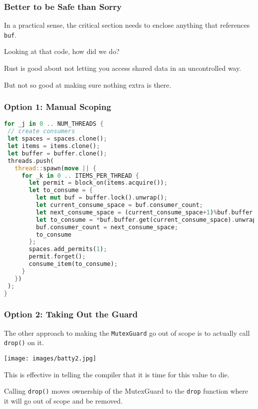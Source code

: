 \begin{frame}
\frametitle{Better to be Safe than Sorry}

In a practical sense, the critical section needs to enclose anything that references \texttt{buf}.

Looking at that code, how did we do?

Rust is good about not letting you access shared data in an uncontrolled way.

But not so good at making sure nothing extra is there.

\end{frame}


\begin{frame}[fragile]
\frametitle{Option 1: Manual Scoping}

\begin{lstlisting}[language=Rust]
for _j in 0 .. NUM_THREADS {
 // create consumers
 let spaces = spaces.clone();
 let items = items.clone();
 let buffer = buffer.clone();
 threads.push(
   thread::spawn(move || {
     for _k in 0 .. ITEMS_PER_THREAD {
       let permit = block_on(items.acquire());
       let to_consume = {
         let mut buf = buffer.lock().unwrap();
         let current_consume_space = buf.consumer_count;
         let next_consume_space = (current_consume_space+1)%buf.buffer.len();
         let to_consume = *buf.buffer.get(current_consume_space).unwrap();
         buf.consumer_count = next_consume_space;
         to_consume
       };
       spaces.add_permits(1);
       permit.forget();
       consume_item(to_consume);
     }
   })
 );
}
\end{lstlisting}

\end{frame}

\begin{frame}
\frametitle{Option 2: Taking Out the Guard}

The other approach to making the \texttt{MutexGuard} go out of scope is to actually call \texttt{drop()} on it. 

\begin{center}
	\texttt{[image: images/batty2.jpg]}
\end{center}

This is effective in telling the compiler that it is time for this value to die. 

Calling \texttt{drop()} moves ownership of the MutexGuard to the \texttt{drop} function where it will go out of scope and be removed. 

\end{frame}


